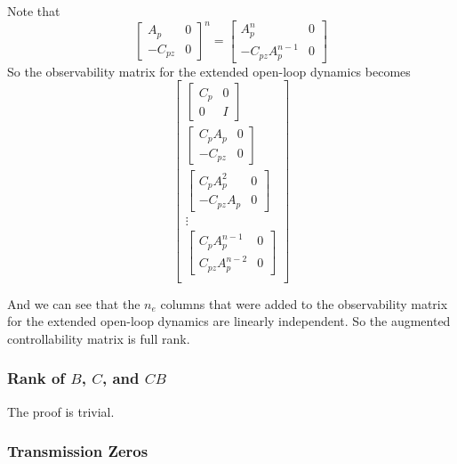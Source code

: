 Note that
\begin{equation*}
  \begin{bmatrix}
    A_{p} & 0 \\
    -C_{pz} & 0
  \end{bmatrix}^{n}=
  \begin{bmatrix}
    A_{p}^{n} & 0 \\
    -C_{pz}A_{p}^{n-1} & 0
  \end{bmatrix}
\end{equation*}
So the observability matrix for the extended open-loop dynamics becomes
\begin{equation*}
  \begin{bmatrix}
    \begin{bmatrix}
      C_{p} & 0 \\
      0 & I
    \end{bmatrix} \\
    \begin{bmatrix}
      C_{p}A_{p} & 0 \\
      -C_{pz} & 0
    \end{bmatrix} \\
    \begin{bmatrix}
      C_{p}A_{p}^{2} & 0 \\
      -C_{pz}A_{p} & 0
    \end{bmatrix} \\
    \vdots \\
    \begin{bmatrix}
      C_{p}A_{p}^{n-1} & 0 \\
      C_{pz}A_{p}^{n-2} & 0
    \end{bmatrix} \\
  \end{bmatrix}
\end{equation*}

And we can see that the $n_{e}$ columns that were added to the observability matrix for the extended open-loop dynamics are linearly independent.
So the augmented controllability matrix is full rank.

\subsubsection{Rank of $B$, $C$, and $CB$}

The proof is trivial.

\subsubsection{Transmission Zeros}

